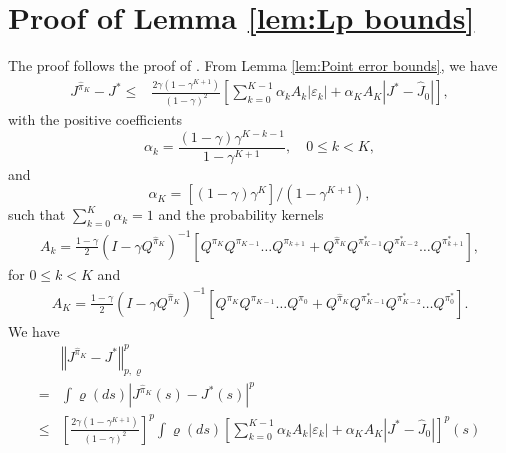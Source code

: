 \documentclass[12pt,technote,onecolumn]{IEEEtran}
\begin{document}
\section*{Proof of Lemma \ref{lem:Lp bounds}}
\begin{IEEEproof}
	The proof follows the proof of \cite[Lemma 4]{munos2008finite}. From
	Lemma \ref{lem:Point error bounds}, we have 		
	\begin{equation*}
	\begin{aligned}
	J^{\widehat{\pi}_{K}}-J^{*}\leq&\frac{2\gamma\left(1-\gamma^{K+1}\right)}{\left(1-\gamma\right)^{2}}
	\left[\sum_{k=0}^{K-1}\alpha_{k}A_{k}\left|\varepsilon_{k}\right|+\alpha_{K}A_{K}|J^{*}-\widehat{J}_{0}|\right],
	\end{aligned}
	\end{equation*}
	with the positive coefficients 		
	\[
	\alpha_{k}=\frac{\left(1-\gamma\right)\gamma^{K-k-1}}{1-\gamma^{K+1}},\quad0\leq k<K,
	\]
	and		
	$$
	\alpha_{K}={[\left(1-\gamma\right)\gamma^{K}]}/{(1-\gamma^{K+1})},
	$$
	such that $\sum_{k=0}^{K}\alpha_{k}=1$ and the probability kernels
	\begin{equation*}		
	\begin{aligned}
	A_{k}  =  \frac{1-\gamma}{2}(I-\gamma Q^{\hat{\pi}_{K}})^{-1}
	[Q^{\pi_{K}}Q^{\pi_{K-1}}\dots Q^{\pi_{k+1}}
	+Q^{\hat{\pi}_{K}}Q^{\pi_{K-1}^{*}}Q^{\pi_{K-2}^{*}}\dots Q^{\pi_{k+1}^{*}}],
	\end{aligned}
	\end{equation*}
	for $0\leq k<K$ and
	\begin{equation*}		
	\begin{aligned}
	A_{K}=\frac{1-\gamma}{2}(I-\gamma Q^{\hat{\pi}_{K}})^{-1}[Q^{\pi_{K}}Q^{\pi_{K-1}}\dots Q^{\pi_{0}}
	+Q^{\hat{\pi}_{K}}Q^{\pi_{K-1}^{*}}Q^{\pi_{K-2}^{*}}\dots Q^{\pi_{0}^{*}}].
	\end{aligned}
	\end{equation*}		
	We have		
	\begin{equation*}		
	\begin{aligned}
	&\left\Vert J^{\widehat{\pi}_{K}}-J^{*}\right\Vert _{p,\varrho}^{p}\\
	= &\int\varrho\left(ds\right)|J^{\widehat{\pi}_{K}}\left(s\right)-J^{*}\left(s\right)|^{p}\\
	\leq & \left[\frac{2\gamma\left(1-\gamma^{K+1}\right)}{\left(1-\gamma\right)^{2}}\right]^{p}
	\int\varrho\left(ds\right)\left[\sum_{k=0}^{K-1}\alpha_{k}A_{k}\left|\varepsilon_{k}\right|+\alpha_{K}A_{K}\left|J^{*}-\widehat{J}_{0}\right|\right]^{p}\left(s\right)\\

\end{aligned}
\end{equation*}
\end{IEEEproof}
\end{document}
